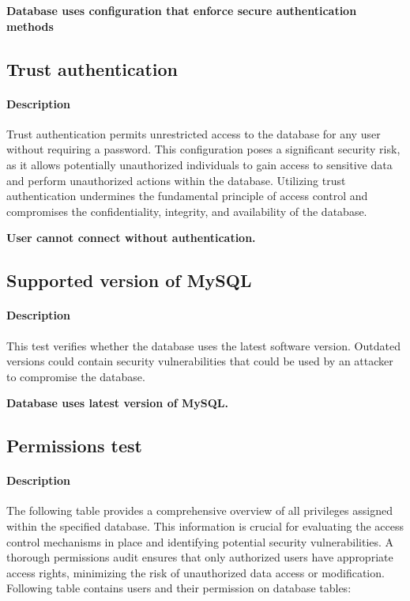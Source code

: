 \textbf{Database uses configuration that enforce secure authentication methods}



\subsection{Trust authentication}
\paragraph{Description} Trust authentication permits unrestricted access to the database for any user without requiring a password. This configuration poses a significant security risk, as it allows potentially unauthorized individuals to gain access to sensitive data and perform unauthorized actions within the database. Utilizing trust authentication undermines the fundamental principle of access control and compromises the confidentiality, integrity, and availability of the database.

\textbf{User cannot connect without authentication.}



\subsection{Supported version of MySQL}
\paragraph{Description} This test verifies whether the database uses the latest software version. Outdated versions could contain security vulnerabilities that could be used by an attacker to compromise the database.

\textbf{Database uses latest version of MySQL.}



\subsection{Permissions test}
\paragraph{Description} The following table provides a comprehensive overview of all privileges assigned within the specified database. This information is crucial for evaluating the access control mechanisms in place and identifying potential security vulnerabilities. A thorough permissions audit ensures that only authorized users have appropriate access rights, minimizing the risk of unauthorized data access or modification. Following table contains users and their permission on database tables:


